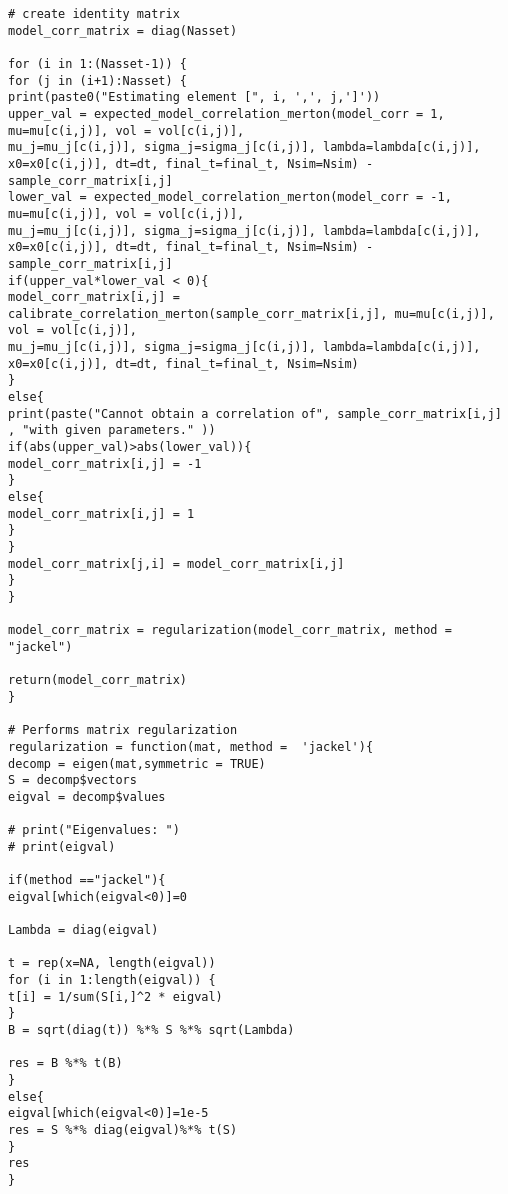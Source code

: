 \begin{lstlisting}
# create identity matrix
model_corr_matrix = diag(Nasset) 

for (i in 1:(Nasset-1)) {
for (j in (i+1):Nasset) {
print(paste0("Estimating element [", i, ',', j,']'))
upper_val = expected_model_correlation_merton(model_corr = 1, mu=mu[c(i,j)], vol = vol[c(i,j)],
mu_j=mu_j[c(i,j)], sigma_j=sigma_j[c(i,j)], lambda=lambda[c(i,j)], 
x0=x0[c(i,j)], dt=dt, final_t=final_t, Nsim=Nsim) -sample_corr_matrix[i,j]
lower_val = expected_model_correlation_merton(model_corr = -1, mu=mu[c(i,j)], vol = vol[c(i,j)],
mu_j=mu_j[c(i,j)], sigma_j=sigma_j[c(i,j)], lambda=lambda[c(i,j)], 
x0=x0[c(i,j)], dt=dt, final_t=final_t, Nsim=Nsim) -sample_corr_matrix[i,j]
if(upper_val*lower_val < 0){
model_corr_matrix[i,j] =  calibrate_correlation_merton(sample_corr_matrix[i,j], mu=mu[c(i,j)], vol = vol[c(i,j)],
mu_j=mu_j[c(i,j)], sigma_j=sigma_j[c(i,j)], lambda=lambda[c(i,j)], 
x0=x0[c(i,j)], dt=dt, final_t=final_t, Nsim=Nsim)
}
else{
print(paste("Cannot obtain a correlation of", sample_corr_matrix[i,j] , "with given parameters." ))
if(abs(upper_val)>abs(lower_val)){
model_corr_matrix[i,j] = -1
}
else{
model_corr_matrix[i,j] = 1
}
}
model_corr_matrix[j,i] = model_corr_matrix[i,j]
}
}

model_corr_matrix = regularization(model_corr_matrix, method = "jackel")

return(model_corr_matrix)
}

# Performs matrix regularization
regularization = function(mat, method =  'jackel'){
decomp = eigen(mat,symmetric = TRUE)
S = decomp$vectors
eigval = decomp$values

# print("Eigenvalues: ")
# print(eigval)

if(method =="jackel"){
eigval[which(eigval<0)]=0

Lambda = diag(eigval)

t = rep(x=NA, length(eigval))
for (i in 1:length(eigval)) {
t[i] = 1/sum(S[i,]^2 * eigval)
}  
B = sqrt(diag(t)) %*% S %*% sqrt(Lambda)

res = B %*% t(B)
}
else{
eigval[which(eigval<0)]=1e-5
res = S %*% diag(eigval)%*% t(S)
}
res
}
\end{lstlisting}

